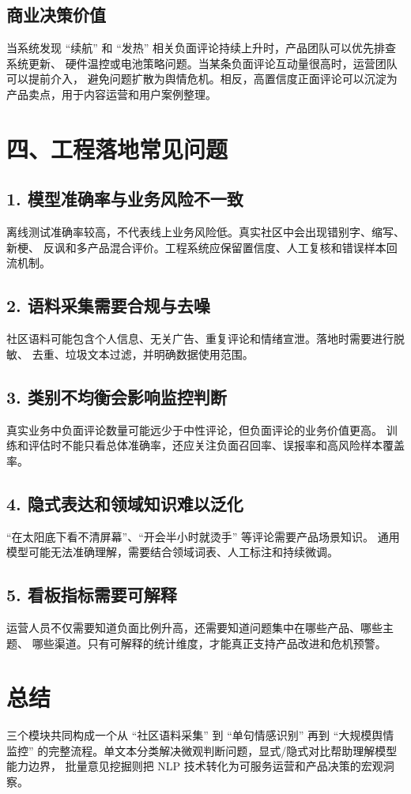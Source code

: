 \documentclass[12pt,a4paper]{article}
\begin{document}
\subsection*{商业决策价值}

当系统发现 ``续航'' 和 ``发热'' 相关负面评论持续上升时，产品团队可以优先排查系统更新、
硬件温控或电池策略问题。当某条负面评论互动量很高时，运营团队可以提前介入，
避免问题扩散为舆情危机。相反，高置信度正面评论可以沉淀为产品卖点，用于内容运营和用户案例整理。

\section*{四、工程落地常见问题}

\subsection*{1. 模型准确率与业务风险不一致}

离线测试准确率较高，不代表线上业务风险低。真实社区中会出现错别字、缩写、新梗、
反讽和多产品混合评价。工程系统应保留置信度、人工复核和错误样本回流机制。

\subsection*{2. 语料采集需要合规与去噪}

社区语料可能包含个人信息、无关广告、重复评论和情绪宣泄。落地时需要进行脱敏、
去重、垃圾文本过滤，并明确数据使用范围。

\subsection*{3. 类别不均衡会影响监控判断}

真实业务中负面评论数量可能远少于中性评论，但负面评论的业务价值更高。
训练和评估时不能只看总体准确率，还应关注负面召回率、误报率和高风险样本覆盖率。

\subsection*{4. 隐式表达和领域知识难以泛化}

``在太阳底下看不清屏幕''、``开会半小时就烫手'' 等评论需要产品场景知识。
通用模型可能无法准确理解，需要结合领域词表、人工标注和持续微调。

\subsection*{5. 看板指标需要可解释}

运营人员不仅需要知道负面比例升高，还需要知道问题集中在哪些产品、哪些主题、
哪些渠道。只有可解释的统计维度，才能真正支持产品改进和危机预警。

\section*{总结}

三个模块共同构成一个从 ``社区语料采集'' 到 ``单句情感识别'' 再到 ``大规模舆情监控''
的完整流程。单文本分类解决微观判断问题，显式/隐式对比帮助理解模型能力边界，
批量意见挖掘则把 NLP 技术转化为可服务运营和产品决策的宏观洞察。
\end{document}
